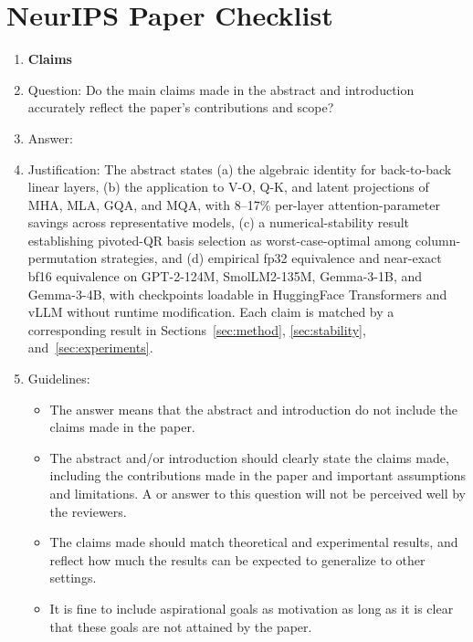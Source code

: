 \section*{NeurIPS Paper Checklist}

\begin{enumerate}

\item {\bf Claims}
    \item[] Question: Do the main claims made in the abstract and introduction accurately reflect the paper's contributions and scope?
    \item[] Answer: \answerYes{} %
    \item[] Justification: The abstract states (a) the algebraic identity for back-to-back linear layers, (b) the application to V-O, Q-K, and latent projections of MHA, MLA, GQA, and MQA, with 8--17\% per-layer attention-parameter savings across representative models, (c) a numerical-stability result establishing pivoted-QR basis selection as worst-case-optimal among column-permutation strategies, and (d) empirical fp32 equivalence and near-exact bf16 equivalence on GPT-2-124M, SmolLM2-135M, Gemma-3-1B, and Gemma-3-4B, with checkpoints loadable in HuggingFace Transformers and vLLM without runtime modification. Each claim is matched by a corresponding result in Sections~\ref{sec:method},
\ref{sec:stability}, and~\ref{sec:experiments}.
    \item[] Guidelines:
    \begin{itemize}
        \item The answer \answerNA{} means that the abstract and introduction do not include the claims made in the paper.
        \item The abstract and/or introduction should clearly state the claims made, including the contributions made in the paper and important assumptions and limitations. A \answerNo{} or \answerNA{} answer to this question will not be perceived well by the reviewers.
        \item The claims made should match theoretical and experimental results, and reflect how much the results can be expected to generalize to other settings.
        \item It is fine to include aspirational goals as motivation as long as it is clear that these goals are not attained by the paper.
    \end{itemize}


\end{enumerate}

